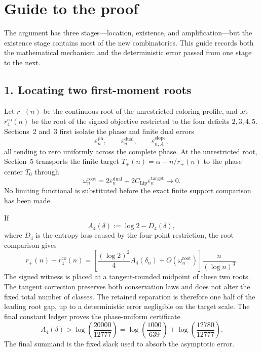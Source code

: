 \section*{Guide to the proof}
\label{sec:proof-architecture-v3}

The argument has three stages---location, existence, and amplification---but
the existence stage contains most of the new combinatorics. This guide records
both the mathematical mechanism and the deterministic error passed from one
stage to the next.

\subsection*{1. Locating two first-moment roots}

Let $r_+(n)$ be the continuous root of the unrestricted coloring profile, and
let $r_4^{\mathrm{co}}(n)$ be the root of the signed objective restricted to
the four deficits $2,3,4,5$. Sections~2 and~3 first isolate the phase and finite
dual errors
\[
  \varepsilon_n^{\mathrm{ph}},
  \qquad
  \varepsilon_n^{\mathrm{dual}},
  \qquad
  \varepsilon_{n,A}^{\mathrm{slope}},
\]
all tending to zero uniformly across the complete phase. At the unrestricted
root, Section~5 transports the finite target
$T_+(n)=\alpha-n/r_+(n)$ to the phase center $T_0$ through
\[
  \omega_n^{\mathrm{root}}
  =2\varepsilon_n^{\mathrm{dual}}
   +2C_{\mathrm{Lip}}\varepsilon_n^{\mathrm{target}}
  \longrightarrow0.
\]
No limiting functional is substituted before the exact finite support
comparison has been made.

If
\[
  A_4(\delta):=\log 2-D_4(\delta),
\]
where $D_4$ is the entropy loss caused by the four-point restriction, the root
comparison gives
\[
  r_+(n)-r_4^{\mathrm{co}}(n)
  =
  \left[
    \frac{(\log 2)^2}{4}A_4(\delta_n)
    +O(\omega_n^{\mathrm{root}})
  \right]
  \frac{n}{(\log n)^3}.
\]
The signed witness is placed at a tangent-rounded midpoint of these two roots.
The tangent correction preserves both conservation laws and does not alter the
fixed total number of classes. The retained separation is therefore one half
of the leading root gap, up to a deterministic error negligible on the target
scale. The final constant ledger proves the phase-uniform certificate
\[
  A_4(\delta)
  >\log\!\left(\frac{20000}{12777}\right)
  =\log\!\left(\frac{1000}{639}\right)
   +\log\!\left(\frac{12780}{12777}\right).
\]
The final summand is the fixed slack used to absorb the asymptotic error.

